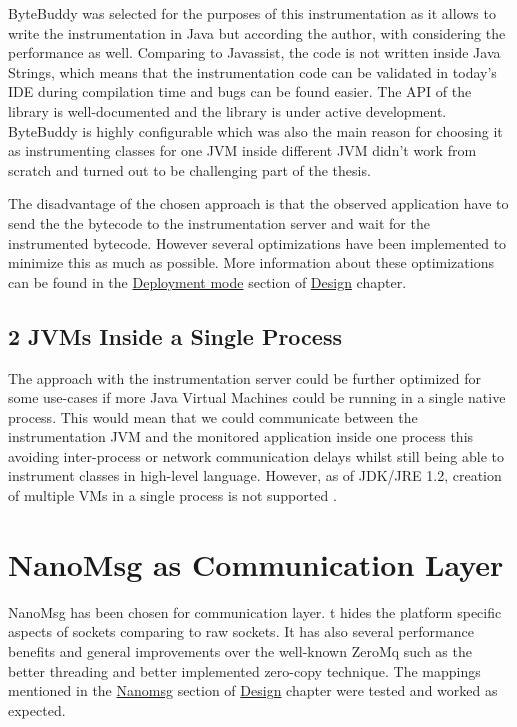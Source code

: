ByteBuddy was selected for the purposes of this instrumentation as it allows to write the instrumentation in Java but according the author, with considering the performance as well. Comparing to Javassist, the code is not written inside Java Strings, which means that the instrumentation code can be validated in today's IDE during compilation time and bugs can be found easier. The API of the library is well-documented and the library is under active development. ByteBuddy is highly configurable which was also the main reason for choosing it as instrumenting classes for one JVM inside different JVM didn't work from scratch and turned out to be challenging part of the thesis.

The disadvantage of the chosen approach is that the observed application have to send the the bytecode to the instrumentation server and wait for the instrumented bytecode. However several optimizations have been implemented to minimize this as much as possible. More information about these optimizations can be found in the \hyperref[sec:deploy_mode]{Deployment mode} section of \hyperref[chap:design]{Design} chapter.

\subsection{2 JVMs Inside a Single Process}
The approach with the instrumentation server could be further optimized for some use-cases if more Java Virtual Machines could be running in a single native process. This would mean that we could communicate between the instrumentation JVM and the monitored application inside one process this avoiding inter-process or network communication delays whilst still being able to instrument classes in high-level language. However, as of JDK/JRE 1.2, creation of multiple VMs in a single process is not supported \cite{MoreJVMOnceProccess}.

\section{NanoMsg as Communication Layer}
NanoMsg has been chosen for communication layer. t hides the platform specific aspects of sockets comparing to raw sockets. It has also several performance benefits and general improvements over the well-known ZeroMq such as the better threading and better implemented zero-copy technique. The mappings mentioned in the \hyperref[sec:nanomsg]{Nanomsg} section of \hyperref[chap:background]{Design} chapter were tested and worked as expected.




